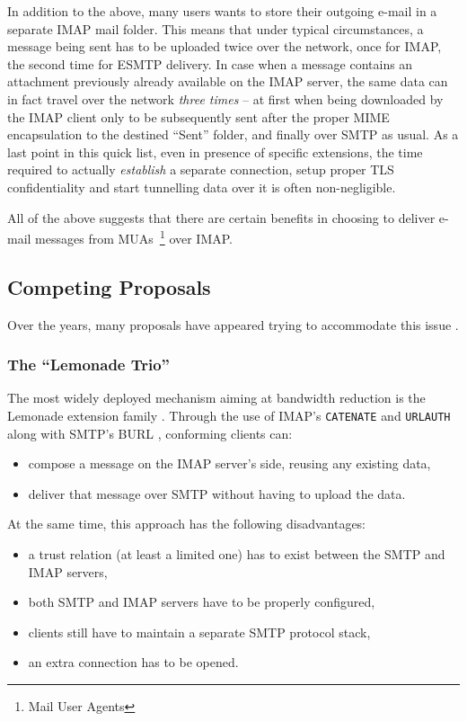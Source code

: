 \documentclass[trojita]{subfiles}
\begin{document}
In addition to the above, many users wants to store their outgoing e-mail in a separate IMAP mail folder.  This means
that under typical circumstances, a message being sent has to be uploaded twice over the network, once for IMAP, the
second time for ESMTP delivery.  In case when a message contains an attachment previously already available on the IMAP
server, the same data can in fact travel over the network {\em three times} -- at first when being downloaded by the
IMAP client only to be subsequently sent after the proper MIME encapsulation to the destined ``Sent'' folder, and
finally over SMTP as usual.  As a last point in this quick list, even in presence of specific extensions, the time
required to actually {\em establish} a separate connection, setup proper TLS confidentiality and start tunnelling data
over it is often non-negligible.

All of the above suggests that there are certain benefits in choosing to deliver e-mail messages from
MUAs~\footnote{Mail User Agents} over IMAP.

\subsection{Competing Proposals}

Over the years, many proposals have appeared trying to accommodate this issue \cite{draft-ietf-lemonade-submit}.

\subsubsection{The ``Lemonade Trio''}

The most widely deployed mechanism aiming at bandwidth reduction is the Lemonade extension family \cite{rfc5550}.
Through the use of IMAP's {\tt CATENATE} \cite{rfc4469} and {\tt URLAUTH} \cite{rfc4467} along with SMTP's BURL
\cite{rfc4468}, conforming clients can:

\begin{itemize}
  \item compose a message on the IMAP server's side, reusing any existing data,
  \item deliver that message over SMTP without having to upload the data.
\end{itemize}

At the same time, this approach has the following disadvantages:

\begin{itemize}
  \item a trust relation (at least a limited one) has to exist between the SMTP and IMAP servers,
  \item both SMTP and IMAP servers have to be properly configured,
  \item clients still have to maintain a separate SMTP protocol stack,
  \item an extra connection has to be opened.
\end{itemize}
\end{document}
